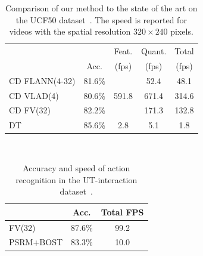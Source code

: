 \documentclass[10pt,twocolumn,letterpaper]{article}
\begin{document}
\begin{table}
\begin{center}
\begin{tabular}{|l|c|c|c|c|}
\hline
		 				&  	 	& Feat.                    & Quant. 	& Total	\\
		 				& Acc.  & (fps)                    & (fps) 	& (fps)	\\\hline
CD FLANN(4-32)	& 81.6\% & \multirow{3}{*}{591.8}   & 52.4  	& 48.1	\\ %
CD VLAD(4) 	 	& 80.6\% &                          & 671.4 	& 314.6	\\ %
CD FV(32)	 		& 82.2\% &                          & 171.3 	& 132.8	\\ %
\hline
DT \cite{Wang12}& 85.6\% & 2.8            	        & 5.1  	& 1.8\\\hline%
\end{tabular}
\smallskip
\caption{Comparison of our method to the state of the art on the UCF50 dataset~\cite{Reddy12}. The speed is reported for videos with the spatial resolution $320\times 240$ pixels.}
\label{tab:ucf_comparison}
\mbox{}\vspace{-1cm}\\
\end{center}
\end{table}


\begin{table}
\begin{center}
\begin{tabular}{|l|c|c|}
\hline
								& Acc.		& Total FPS	\\\hline
FV(32)						& 87.6\%		& 99.2		\\\hline
PSRM+BOST\cite{Yu10}	& 83.3\%		& 10.0 		\\\hline

\end{tabular}
\mbox{}\vspace{.2cm}\\
\caption{Accuracy and speed of action recognition in the UT-interaction dataset~\cite{Ryoo10}.\vspace{-.6cm}}
\label{tab:uti_comparison}
\end{center}
\end{table}
\end{document}
